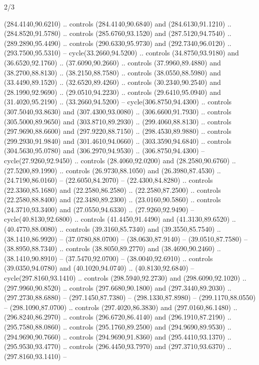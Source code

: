 \begin{flagdescription}{2/3}
\begin{scope}[xshift=0.5\flaglength,yshift=0.5\flagwidth,scale=\stretchfactor]
\begin{scope}[scale=0.001645\flagwidth,yshift=65mm,xshift=-63mm]
\begin{scope}[y=0.80pt, x=0.80pt, yscale=-1,]
\begin{scope}[cm={{1.33333,0.0,0.0,1.33333,(0.0,1e-05)}}]
  (284.4140,90.6210) .. controls (284.4140,90.6840) and (284.6130,91.1210) ..
  (284.8520,91.5780) .. controls (285.6760,93.1520) and (287.5120,94.7540) ..
  (289.2890,95.4490) .. controls (290.6330,95.9730) and (292.7340,96.0120) ..
  (293.7500,95.5310) -- cycle(33.2660,94.5200) .. controls (34.8750,93.9180) and
  (36.6520,92.1760) .. (37.6090,90.2660) .. controls (37.9960,89.4880) and
  (38.2700,88.8130) .. (38.2150,88.7580) .. controls (38.0550,88.5980) and
  (33.4490,89.1520) .. (32.6520,89.4260) .. controls (30.2340,90.2540) and
  (28.1990,92.9690) .. (29.0510,94.2230) .. controls (29.6410,95.0940) and
  (31.4020,95.2190) .. (33.2660,94.5200) -- cycle(306.8750,94.4300) .. controls
  (307.5040,93.8630) and (307.4300,93.0080) .. (306.6600,91.7930) .. controls
  (305.5000,89.9650) and (303.8710,89.2930) .. (299.4060,88.8130) .. controls
  (297.9690,88.6600) and (297.9220,88.7150) .. (298.4530,89.9880) .. controls
  (299.2930,91.9840) and (301.4610,94.0660) .. (303.3590,94.6840) .. controls
  (304.5630,95.0780) and (306.2970,94.9530) .. (306.8750,94.4300) --
  cycle(27.9260,92.9450) .. controls (28.4060,92.0200) and (28.2580,90.6760) ..
  (27.5200,89.1990) .. controls (26.9730,88.1050) and (26.3980,87.4530) ..
  (24.7190,86.0160) -- (22.6050,84.2070) -- (22.4300,84.8280) .. controls
  (22.3360,85.1680) and (22.2580,86.2580) .. (22.2580,87.2500) .. controls
  (22.2580,88.8400) and (22.3480,89.2300) .. (23.0160,90.5860) .. controls
  (24.3710,93.3400) and (27.0550,94.6330) .. (27.9260,92.9490) --
  cycle(40.8130,92.6800) .. controls (41.4450,91.4490) and (41.3130,89.6520) ..
  (40.4770,88.0080) .. controls (39.3160,85.7340) and (39.3550,85.7540) ..
  (38.1410,86.9920) -- (37.0780,88.0700) -- (38.0630,87.9140) --
  (39.0510,87.7580) -- (38.8950,88.7340) .. controls (38.8050,89.2770) and
  (38.4690,90.2460) .. (38.1410,90.8910) -- (37.5470,92.0700) --
  (38.0040,92.6910) .. controls (39.0350,94.0780) and (40.1020,94.0740) ..
  (40.8130,92.6840) -- cycle(297.8160,93.1410) .. controls (298.5940,92.2730)
  and (298.6090,92.1020) .. (297.9960,90.8520) .. controls (297.6680,90.1800)
  and (297.3440,89.2030) .. (297.2730,88.6880) -- (297.1450,87.7380) --
  (298.1330,87.8980) -- (299.1170,88.0550) -- (298.1090,87.0700) .. controls
  (297.4020,86.3830) and (297.0160,86.1480) .. (296.8240,86.2970) .. controls
  (296.6720,86.4140) and (296.1910,87.2190) .. (295.7580,88.0860) .. controls
  (295.1760,89.2500) and (294.9690,89.9530) .. (294.9690,90.7660) .. controls
  (294.9690,91.8360) and (295.4410,93.1370) .. (295.9530,93.4770) .. controls
  (296.4450,93.7970) and (297.3710,93.6370) .. (297.8160,93.1410) --

\end{scope}
\end{scope}
\end{scope}
\end{scope}
\end{flagdescription}
